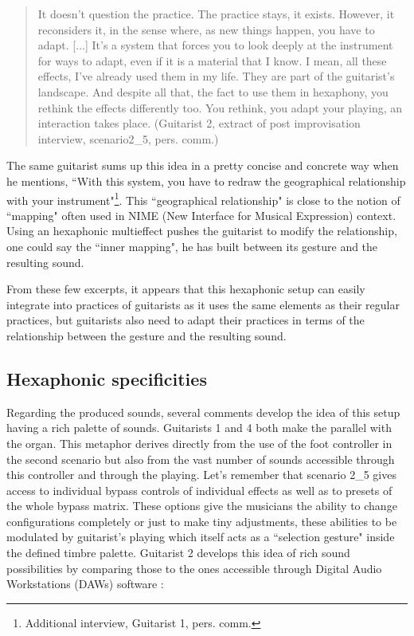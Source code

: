 \documentclass{article}
\begin{document}
    \begin{quote}
     It doesn't question the practice. The practice stays, it exists. However, it reconsiders it, in the sense where, as new things happen, you have to adapt. [...] It's a system that forces you to look deeply at the instrument for ways to adapt, even if it is a material that I know. I mean, all these effects, I've already used them in my life. They are part of the guitarist's landscape. And despite all that, the fact to use them in hexaphony, you rethink the effects differently too. You rethink, you adapt your playing, an interaction takes place. (Guitarist 2, extract of post improvisation interview, scenario2\_5, pers. comm.)
    \end{quote}

The same guitarist sums up this idea in a pretty concise and concrete way when he mentions, ``With this system, you have to redraw the geographical relationship with your instrument"\footnote{Additional interview, Guitarist 1, pers. comm.}. This ``geographical relationship" is close to the notion of ``mapping" often used in NIME (New Interface for Musical Expression) context. Using an hexaphonic multieffect pushes the guitarist to modify the relationship, one could say the ``inner mapping", he has built between its gesture and the resulting sound. 

From these few excerpts, it appears that this hexaphonic setup can easily integrate into practices of guitarists as it uses the same elements as their regular practices, but guitarists also need to adapt their practices in terms of the relationship between the gesture and the resulting sound.




\subsection{Hexaphonic specificities}

Regarding the produced sounds, several comments develop the idea of this setup having a rich palette of sounds. Guitarists 1 and 4 both make the parallel with the organ. This metaphor derives directly from the use of the foot controller in the second scenario but also from the vast number of sounds accessible through this controller  and through the playing.  Let's remember that scenario 2\_5 gives access to individual bypass controls of individual effects as well as to presets of the whole bypass matrix. These options give the musicians the ability to change configurations completely or just to make tiny adjustments, these abilities to be modulated by guitarist's playing which itself acts as a ``selection gesture" \cite{sci:Cadoz94} inside the defined timbre palette.
Guitarist 2 develops this idea of rich sound possibilities by comparing those to the ones accessible through Digital Audio Workstations (DAWs) software : 
\end{document}
